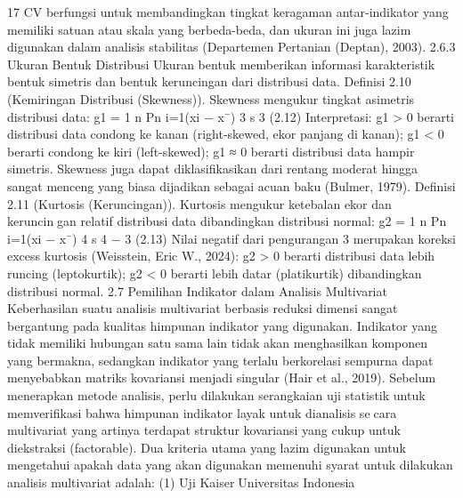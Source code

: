 17
CV berfungsi untuk membandingkan tingkat keragaman antar-indikator yang memiliki
satuan atau skala yang berbeda-beda, dan ukuran ini juga lazim digunakan dalam analisis
stabilitas (Departemen Pertanian (Deptan), 2003).
2.6.3 Ukuran Bentuk Distribusi
Ukuran bentuk memberikan informasi karakteristik bentuk simetris dan bentuk
keruncingan dari distribusi data.
Definisi 2.10 (Kemiringan Distribusi (Skewness)). Skewness mengukur tingkat asimetris
distribusi data:
g1 =
1
n
Pn
i=1(xi − x¯)
3
s
3
(2.12)
Interpretasi: g1 > 0 berarti distribusi data condong ke kanan (right-skewed, ekor panjang
di kanan); g1 < 0 berarti condong ke kiri (left-skewed); g1 ≈ 0 berarti distribusi data
hampir simetris. Skewness juga dapat diklasifikasikan dari rentang moderat hingga sangat
menceng yang biasa dijadikan sebagai acuan baku (Bulmer, 1979).
Definisi 2.11 (Kurtosis (Keruncingan)). Kurtosis mengukur ketebalan ekor dan keruncingan relatif distribusi data dibandingkan distribusi normal:
g2 =
1
n
Pn
i=1(xi − x¯)
4
s
4
− 3 (2.13)
Nilai negatif dari pengurangan 3 merupakan koreksi excess kurtosis (Weisstein, Eric W.,
2024): g2 > 0 berarti distribusi data lebih runcing (leptokurtik); g2 < 0 berarti lebih datar
(platikurtik) dibandingkan distribusi normal.
2.7 Pemilihan Indikator dalam Analisis Multivariat
Keberhasilan suatu analisis multivariat berbasis reduksi dimensi sangat bergantung
pada kualitas himpunan indikator yang digunakan. Indikator yang tidak memiliki hubungan
satu sama lain tidak akan menghasilkan komponen yang bermakna, sedangkan indikator
yang terlalu berkorelasi sempurna dapat menyebabkan matriks kovariansi menjadi singular
(Hair et al., 2019). Sebelum menerapkan metode analisis, perlu dilakukan serangkaian
uji statistik untuk memverifikasi bahwa himpunan indikator layak untuk dianalisis secara multivariat yang artinya terdapat struktur kovariansi yang cukup untuk diekstraksi
(factorable).
Dua kriteria utama yang lazim digunakan untuk mengetahui apakah data yang akan
digunakan memenuhi syarat untuk dilakukan analisis multivariat adalah: (1) Uji KaiserUniversitas Indonesia

